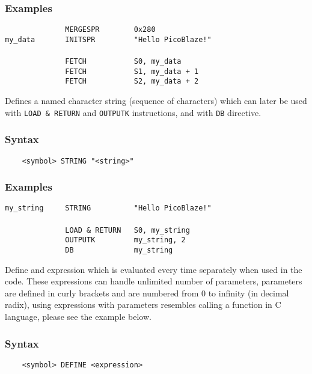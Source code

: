     \subsubsection{Examples}
        \verb'              MERGESPR        0x280'\\
        \verb'my_data       INITSPR         "Hello PicoBlaze!"'\\
        \verb''\\
        \verb'              FETCH           S0, my_data'\\
        \verb'              FETCH           S1, my_data + 1'\\
        \verb'              FETCH           S2, my_data + 2'

    Defines a named character string (sequence of characters) which can later be used with \texttt{LOAD \& RETURN} and \texttt{OUTPUTK} instructions, and with \texttt{DB} directive.

    \subsubsection{Syntax}
        \verb'    <symbol> STRING "<string>"'

    \subsubsection{Examples}
        \verb'my_string     STRING          "Hello PicoBlaze!"'\\
        \verb''\\
        \verb'              LOAD & RETURN   S0, my_string'\\
        \verb'              OUTPUTK         my_string, 2'\\
        \verb'              DB              my_string'

\clearpage
{}
    Define and expression which is evaluated every time separately when used in the code. These expressions can handle unlimited number of parameters, parameters are defined in curly brackets and are numbered from 0 to infinity (in decimal radix), using expressions with parameters resembles calling a function in C language, please see the example below.

    \subsubsection{Syntax}
        \verb'    <symbol> DEFINE <expression>'

